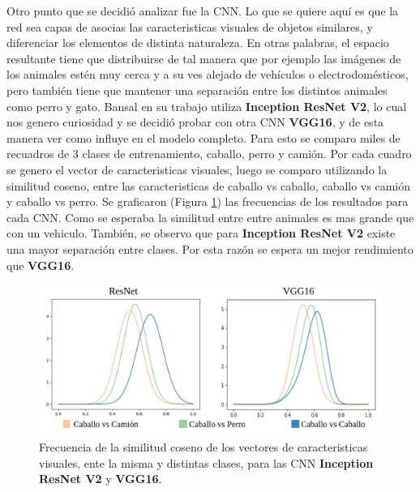 Otro punto que se decidió analizar fue la CNN. Lo que se quiere aquí es que la red sea capas de asocias las caracteristicas visuales de objetos similares, y diferenciar los elementos de distinta naturaleza. En otras palabras, el espacio resultante tiene que distribuirse de tal manera que por ejemplo las imágenes de los animales estén muy cerca y a su ves alejado de vehículos o electrodomésticos, pero también tiene que mantener una separación entre los distintos animales como perro y gato. Bansal en su trabajo utiliza \textbf{Inception ResNet V2}, lo cual nos genero curiosidad y se decidió probar con otra CNN \textbf{VGG16}, y de esta manera ver como influye en el modelo completo. Para esto se comparo miles de recuadros de 3 clases de entrenamiento, caballo, perro y camión. Por cada cuadro se genero el vector de caracteristicas visuales, luego se comparo utilizando la similitud coseno, entre las caracteristicas de caballo vs caballo, caballo vs camión y caballo vs perro. Se graficaron (Figura \ref{fig:vgg-vs-resnet}) las frecuencias de los resultados para cada CNN. Como se esperaba la similitud entre entre animales es mas grande que con un vehiculo. También, se observo que para \textbf{Inception ResNet V2} existe una mayor separación entre clases. Por esta razón se espera un mejor rendimiento que \textbf{VGG16}.\\

\begin{figure}
	\centering
	\includegraphics[width=0.8\linewidth]{img/vgg-vs-resnet}
	\caption{Frecuencia de la similitud coseno de los vectores de caracteristicas visuales, ente la misma y distintas clases, para las CNN  \textbf{Inception ResNet V2} y \textbf{VGG16}.}
	\label{fig:vgg-vs-resnet}
\end{figure}

